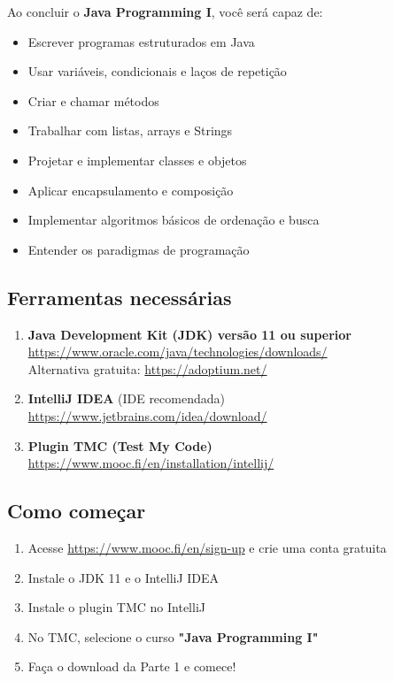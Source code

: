 \documentclass[11pt,a4paper]{article}
\begin{document}
Ao concluir o \textbf{Java Programming I}, você será capaz de:

\begin{itemize}
  \item Escrever programas estruturados em Java
  \item Usar variáveis, condicionais e laços de repetição
  \item Criar e chamar métodos
  \item Trabalhar com listas, arrays e Strings
  \item Projetar e implementar classes e objetos
  \item Aplicar encapsulamento e composição
  \item Implementar algoritmos básicos de ordenação e busca
  \item Entender os paradigmas de programação
\end{itemize}

\subsection{Ferramentas necessárias}

\begin{enumerate}
  \item \textbf{Java Development Kit (JDK) versão 11 ou superior}\\
    \url{https://www.oracle.com/java/technologies/downloads/}\\
    Alternativa gratuita: \url{https://adoptium.net/}

  \item \textbf{IntelliJ IDEA} (IDE recomendada)\\
    \url{https://www.jetbrains.com/idea/download/}

  \item \textbf{Plugin TMC (Test My Code)}\\
    \url{https://www.mooc.fi/en/installation/intellij/}
\end{enumerate}

\subsection{Como começar}

\begin{enumerate}
  \item Acesse \url{https://www.mooc.fi/en/sign-up} e crie uma conta gratuita
  \item Instale o JDK 11 e o IntelliJ IDEA
  \item Instale o plugin TMC no IntelliJ
  \item No TMC, selecione o curso \textbf{"Java Programming I"}
  \item Faça o download da Parte 1 e comece!
\end{enumerate}
\end{document}
